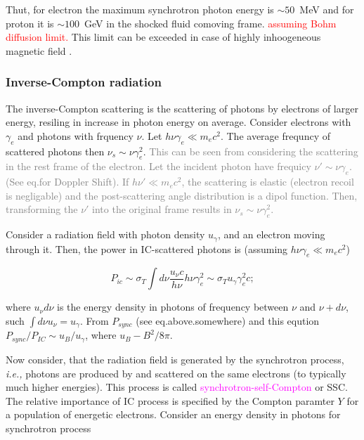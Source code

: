 \documentclass[11pt,a4paper,headinclude=true,DIV=14,BCOR=8mm,chapterprefix,listof=totoc,twoside,openright,abstracton]{scrbook}
\newcommand{\red}[1]{\textcolor{red}{#1}}
\newcommand{\magenta}[1]{\textcolor{magenta}{#1}} %
\newcommand{\gray}[1]{\textcolor{gray}{#1}}
\begin{document}
Thut, for electron the maximum synchrotron photon energy is $\sim 50$~MeV and for proton it is $\sim 100$~GeV in the shocked fluid comoving frame. \red{assuming Bohm diffusion limit.}
This limit can be exceeded in case of highly inhoogeneous magnetic field \cite{Kumar et al. (2012)}.


\subsubsection{Inverse-Compton radiation}

The inverse-Compton scattering is the scattering of photons by electrons of larger energy, resiling in increase in photon energy on average.
Consider electrons with $\gamma_e$ and photons with frquency $\nu$. Let $h\nu\gamma_e \ll m_e c^2$. The average frequncy of scattered photons then $\nu_s\sim\nu\gamma^2_e$.
\gray{
    This can be seen from considering the scattering in the rest frame of the electron.
    Let the incident photon have frequicy $\nu' \sim \nu\gamma_e$. (See eq.for Doppler Shift). If $h\nu'\ll m_e c^2$, the scattering is elastic (electron recoil is negligable) and the post-scattering angle distribution is a dipol function. 
    Then, transforming the $\nu'$ into the original frame results in $\nu_s\sim\nu\gamma_e^2$.
}

Consider a radiation field with photon density $u_{\gamma}$, and an electron moving through it. Then, the power in IC-scattered photons is (assuming $h\nu\gamma_e\ll m_e c^2$)

\begin{equation}
    P_{ic} \sim \sigma_T \int d\nu \frac{u_{\nu} c}{h\nu} h\nu\gamma_e^2 \sim \sigma_T u_{\gamma}\gamma^2_e c;
\end{equation}

where $u_{\nu}d\nu$ is the energy density in photons of frequency between $\nu$ and $\nu+d\nu$, such $\int d\nu u_{\nu} = u_{\gamma}$. From $P_{sync}$ (see eq.above.somewhere) and this eqution $P_{sync}/P_{IC} \sim u_{B}/u_{\gamma}$, where $u_{B}- B^2 / 8\pi$.

Now consider, that the radiation field is generated by the synchrotron process, \textit{i.e.,} photons are produced by and scattered on the same electrons (to typically much higher energies). This process is called \magenta{synchrotron-self-Compton} or SSC.
The relative importance of IC process is specified by the Compton paramter $Y$ for a population of energetic electrons. Consider an energy density in photons for synchrotron process
\end{document}
